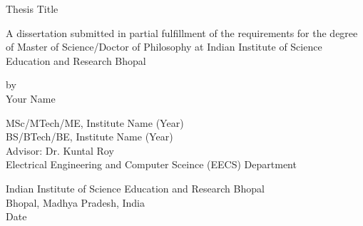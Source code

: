 \documentclass[a4paper, 12pt]{book}
\begin{document}
\thispagestyle{empty}

\thispagestyle{empty}
\cleardoublepage

\thispagestyle{empty}

\thispagestyle{empty}
\cleardoublepage



{}
{}
\begin{titlepage}
\noindent
\begin{center}
\vspace*{0.5mm}
{{\large{Thesis Title}}}

\vspace{1cm}

\large{A dissertation submitted in partial fulfillment of the requirements for the degree of Master of Science/Doctor of Philosophy at Indian Institute of Science Education and Research Bhopal}

\vspace{4cm}

\large{by}\\
\vspace{0.5cm}
\large{Your Name}\\
\begin{large}
{MSc/MTech/ME, Institute Name (Year)}\\
{BS/BTech/BE, Institute Name (Year)}\\
\vspace{1.5cm}
Advisor: Dr. Kuntal Roy\\
Electrical Engineering and Computer Sceince (EECS) Department
\end{large}

\vspace{3cm}
\begin{large}
Indian Institute of Science Education and Research Bhopal\\
Bhopal, Madhya Pradesh, India\\
Date
\end{large}
\end{center}

\end{titlepage}
\cleardoublepage

{}
\tableofcontents
\cleardoublepage

{}
\listoffigures
\cleardoublepage

{}
\listoftables
\cleardoublepage
\end{document}
